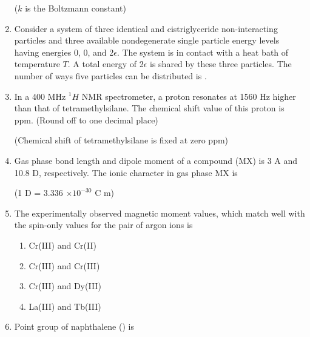 \documentclass[journal,12pt,onecolumn]{IEEEtran}
\theoremstyle{remark}
\begin{document}
\begin{enumerate}
(\(k\) is the Boltzmann constant) \hfill{}

\item Consider a system of three identical and cistriglyceride non-interacting particles and three available nondegenerate single particle energy levels having energies 0, 0, and 2\(\epsilon\). The system is in contact with a heat bath of temperature \(T\). A total energy of 2\(\epsilon\) is shared by these three particles. The number of ways five particles can be distributed is . \hfill{}

\item In a 400 MHz \(^1H\) NMR spectrometer, a proton resonates at 1560 Hz higher than that of tetramethylsilane. The chemical shift value of this proton is  ppm. (Round off to one decimal place)

(Chemical shift of tetramethylsilane is fixed at zero ppm) \hfill{}

\item Gas phase bond length and dipole moment of a compound (MX) is 3 A and 10.8 D, respectively. The ionic character in gas phase MX is  %

(1 D = 3.336 \(\times 10^{-30}\) C m) \hfill{}





\item The experimentally observed magnetic moment values, which match well with the spin-only values for the pair of argon ions is \hfill{}
\begin{multicols}{2}
\begin{enumerate}
\item  Cr(III) and Cr(II)
\item  Cr(III) and Cr(III)
\item  Cr(III) and Dy(III)
\item  La(III) and Tb(III)
\end{enumerate}
\end{multicols}




\item Point group of naphthalene () is \hfill{}


\end{enumerate}
\end{document}
